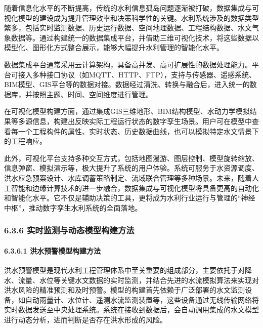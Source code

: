 随着信息化水平的不断提高，传统的水利信息孤岛问题逐渐被打破，数据集成与可视化模型的建设成为提升管理效率和决策科学性的关键。水利系统涉及的数据类型繁多，包括实时监测数据、历史运行数据、空间地理数据、工程结构数据、水文气象数据等。通过构建统一的数据集成平台，并借助三维可视化技术，将这些数据以模型化、图形化方式整合展示，能够大幅提升水利管理的智能化水平。

数据集成平台通常采用云计算架构，具备高并发、高可扩展性的数据处理能力。平台可接入多种接口协议（如MQTT、HTTP、FTP），支持与传感器、遥感系统、BIM模型、GIS平台等的数据对接。数据经过清洗、转换与融合后，进入统一的数据库，并按照主题、时间、空间维度进行管理。

在可视化模型构建方面，通过集成GIS三维地形、BIM结构模型、水动力学模拟结果等多源信息，构建出反映实际工程运行状态的数字孪生场景。用户可在模型中查看每一个工程构件的属性、实时状态、历史数据曲线，也可以模拟特定水文情景下的工程响应。

此外，可视化平台支持多种交互方式，包括地图漫游、图层控制、模型旋转缩放、信息弹窗、模拟演示等，极大提升了系统的用户体验。系统可服务于水资源调度、洪水应急预案设计、水库调蓄策略制定、流域联合管理等多种场景。未来，随着人工智能和边缘计算技术的进一步融合，数据集成与可视化模型将具备更高的自动化和智能化水平。它不仅是辅助决策的工具，更将成为水利行业运行与管理的``神经中枢''，推动数字孪生水利系统的全面落地。

\hypertarget{ux5b9eux65f6ux76d1ux6d4bux4e0eux52a8ux6001ux6a21ux578bux6784ux5efaux65b9ux6cd5}{%
\subsubsection{6.3.6 实时监测与动态模型构建方法}\label{ux5b9eux65f6ux76d1ux6d4bux4e0eux52a8ux6001ux6a21ux578bux6784ux5efaux65b9ux6cd5}}

\hypertarget{ux6d2aux6c34ux9884ux8b66ux6a21ux578bux6784ux5efaux65b9ux6cd5}{%
\paragraph{6.3.6.1 洪水预警模型构建方法}\label{ux6d2aux6c34ux9884ux8b66ux6a21ux578bux6784ux5efaux65b9ux6cd5}}

洪水预警模型是现代水利工程管理体系中至关重要的组成部分，主要依托于对降水、流量、水位等关键水文数据的实时监测，并结合先进的水流模拟算法来实现对洪水风险的精准预测和及时预警。模型的构建首先依赖于广泛部署的水文监测设备，如自动雨量计、水位计、遥测水流监测装置等，这些设备通过无线传输网络将实时数据发送至中央处理系统。系统在接收到数据后，会自动调用集成的水文模型进行动态分析，进而判断是否存在洪水形成的风险。

